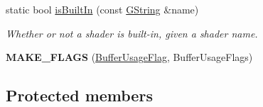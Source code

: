 \begin{DoxyCompactItemize}
static bool \mbox{\hyperlink{classrev_1_1_shader_program_a9fb09af1c3867c41b10edddcd3cc3088}{is\+Built\+In}} (const \mbox{\hyperlink{classrev_1_1_g_string}{G\+String}} \&name)
\begin{DoxyCompactList}\small\item\em Whether or not a shader is built-\/in, given a shader name. \end{DoxyCompactList}\item 
\mbox{\label{classrev_1_1_shader_program_af6ad65584c7968bd49b6b905ee795eb0}} 
{\bfseries M\+A\+K\+E\+\_\+\+F\+L\+A\+GS} (\mbox{\hyperlink{classrev_1_1_shader_program_a4ee618c46bc807822429a59aa11dfa63}{Buffer\+Usage\+Flag}}, Buffer\+Usage\+Flags)
\end{DoxyCompactItemize}
\subsection*{Protected members}
